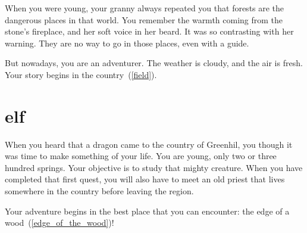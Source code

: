 When you were young, your granny always repeated you that forests are the
dangerous places in that world. You remember the warmth coming from the
stone's fireplace, and her soft voice in her beard. It was so contrasting with
her warning. They are no way to go in those places, even with a guide.

But nowadays, you are an adventurer. The weather is cloudy, and the air is
fresh. Your story begins in the country~(\ref{field}).

\section{elf}

When you heard that a dragon came to the country of Greenhil, you though it was
time to make something of your life. You are young, only two or three hundred
springs. Your objective is to study that mighty creature. When you have
completed that first quest, you will also have to meet an old priest that lives
somewhere in the country before leaving the region.

Your adventure begins in the best place that you can encounter: the edge of a
wood~(\ref{edge_of_the_wood})!
